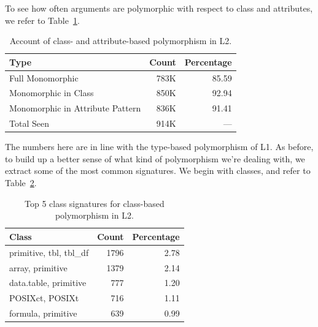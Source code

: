 \documentclass[acmsmall,10pt,review,anonymous]{acmart}\settopmatter{printfolios=true,printccs=false,printacmref=false}
\begin{document}
To see how often arguments are polymorphic with respect to class and attributes, we refer to Table~\ref{tab:classcountsL2}.

\begin{table}[ht]
\label{tab:classcountsL2}
\centering
\begin{tabular}{lrr}
  \hline
Type & Count & Percentage \\
  \hline
Full Monomorphic & 783K & 85.59 \\
  Monomorphic in Class & 850K & 92.94 \\
  Monomorphic in Attribute Pattern & 836K & 91.41 \\
  Total Seen & 914K & --- \\
   \hline
\end{tabular}
\caption{Account of class- and attribute-based polymorphism in L2.}
\end{table}

The numbers here are in line with the type-based polymorphism of L1.
As before, to build up a better sense of what kind of polymorphism we're dealing with, we extract some of the most common signatures.
We begin with classes, and refer to Table~\ref{tab:classpolyL2}.

\begin{table}[ht]
\label{tab:classpolyL2}
\centering
\begin{tabular}{lrr}
  \hline
Class & Count & Percentage \\
  \hline
  primitive, tbl, tbl\_df & 1796 & 2.78 \\
  array, primitive & 1379 & 2.14 \\
  data.table, primitive & 777 & 1.20 \\
  POSIXct, POSIXt & 716 & 1.11 \\
  formula, primitive & 639 & 0.99 \\
   \hline
\end{tabular}
\caption{Top 5 class signatures for class-based polymorphism in L2.}
\end{table}

\end{document}
